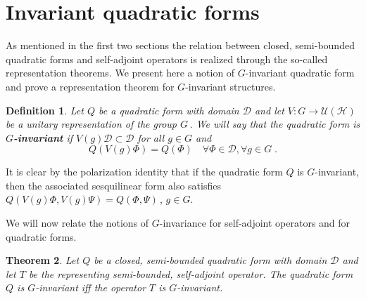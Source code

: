 \documentclass[a4paper,12pt]{amsart}
\renewcommand{\H}{\mathcal{H}}
\newcommand{\D}{\mathcal{D}}
\newcommand{\1}{\mathbb{I}}
\newtheorem{theorem}{Theorem}
\newtheorem{definition}[theorem]{Definition}
\numberwithin{equation}{section}
\numberwithin{theorem}{section}
\begin{document}
\section{Invariant quadratic forms}
\label{sec:InvariantQF}

As mentioned in the first two sections the relation between closed, semi-bounded quadratic forms and self-adjoint operators
is realized through the so-called representation theorems.
We present here a notion of $G$-invariant quadratic form and prove a
representation theorem for $G$-invariant structures.

\begin{definition}
Let $Q$ be a quadratic form with domain $\D$ and let $V:G\to\mathcal{U}(\H)$ be a unitary representation of the group $G$\,.
We will say that the quadratic form is \textbf{$G$-invariant} if $V(g)\D\subset\D$  for all $g\in G$ and
$$Q(V(g)\Phi)=Q(\Phi)\quad\forall \Phi\in\D, \forall g\in G\;.$$
\end{definition}

It is clear by the polarization identity that if the quadratic form $Q$ is $G$-invariant,
then the associated sesquilinear form also satisfies $Q(V(g)\Phi,V(g)\Psi)=Q(\Phi,\Psi)$\,, $g\in G$.

We will now relate the notions of $G$-invariance for self-adjoint operators and for quadratic forms.

\begin{theorem}\label{QAinvariant}
Let $Q$ be a closed, semi-bounded quadratic form with domain $\D$ and let $T$ be the representing semi-bounded, self-adjoint operator.
The quadratic form $Q$ is $G$-invariant iff the operator $T$ is $G$-invariant.
\end{theorem}
\end{document}
